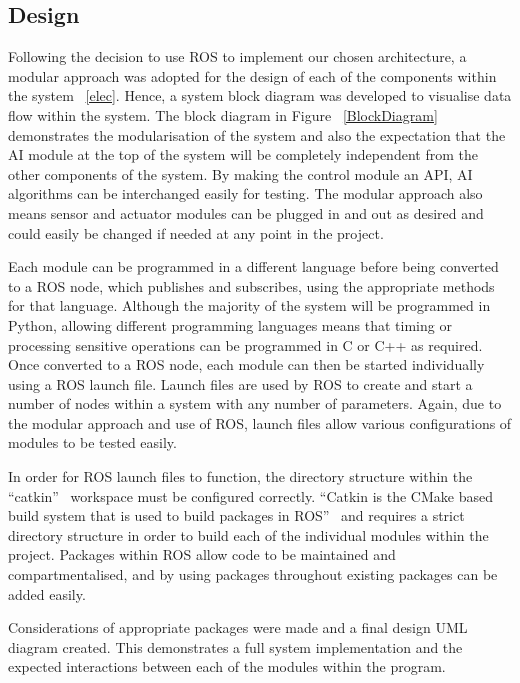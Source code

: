 \subsection{Design}\label{soft/ROS/design}
Following the decision to use ROS to implement our chosen architecture, a modular 
approach was adopted for the design of each of the components within the system~
\ref{elec}. Hence, a system block diagram was developed to visualise data flow 
within the system.  The block diagram in Figure~
\ref{BlockDiagram} demonstrates the modularisation of the system and also the 
expectation that the AI module at the top of the system will be completely 
independent from the other components of the system. By making the control module 
an API, AI algorithms can be interchanged easily for testing. The modular 
approach also means sensor and actuator modules can be plugged in and out as 
desired and could easily be changed if needed at any point in the project. 

Each module can be programmed in a different language before being converted to a 
ROS node, which publishes and subscribes, using the appropriate methods for that 
language. Although the majority of the system will be programmed in Python, 
allowing different programming languages means that timing or processing 
sensitive operations can be programmed in C or C++ as required. Once converted to 
a ROS node, each module can then be started individually using a ROS launch file. 
Launch files are used by ROS to create and start a number of nodes within a 
system with any number of parameters. Again, due to the modular approach and use 
of ROS, launch files allow various configurations of modules to be tested easily.  

In order for ROS launch files to function, the directory structure within the 
``catkin''~\cite{catkin} workspace must be configured correctly. ``Catkin is the 
CMake based build system that is used to build packages in ROS''~\cite{gitcatkin} 
and requires a strict directory structure in order to build each of the 
individual modules within the project. Packages within ROS allow code to be 
maintained and compartmentalised, and by using packages throughout existing 
packages can be added easily. 

Considerations of appropriate packages were made and a final design UML diagram 
created. This demonstrates a full system 
implementation and the expected interactions between each of the modules within 
the program. 
